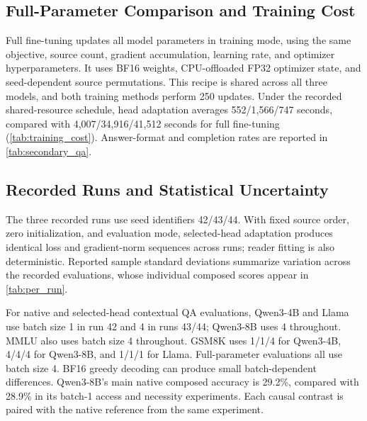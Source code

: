 \subsection{Full-Parameter Comparison and Training Cost}
\label{app:fullft_protocol}

Full fine-tuning updates all model parameters in training mode, using the same objective, source count, gradient accumulation, learning rate, and optimizer hyperparameters. It uses BF16 weights, CPU-offloaded FP32 optimizer state, and seed-dependent source permutations. This recipe is shared across all three models, and both training methods perform 250 updates. Under the recorded shared-resource schedule, head adaptation averages 552/1,566/747 seconds, compared with 4,007/34,916/41,512 seconds for full fine-tuning (\cref{tab:training_cost}). Answer-format and completion rates are reported in \cref{tab:secondary_qa}.

\begin{table}[!htbp]
  \centering
  \caption{Training workload and measured duration across three recorded runs. Both methods use one pass over 2,000 composed sources.}
  \label{tab:training_cost}
  \small
  \setlength{\tabcolsep}{5pt}
  
\end{table}

\subsection{Recorded Runs and Statistical Uncertainty}
\label{app:uncertainty}

The three recorded runs use seed identifiers 42/43/44. With fixed source order, zero initialization, and evaluation mode, selected-head adaptation produces identical loss and gradient-norm sequences across runs; reader fitting is also deterministic. Reported sample standard deviations summarize variation across the recorded evaluations, whose individual composed scores appear in \cref{tab:per_run}.

For native and selected-head contextual QA evaluations, Qwen3-4B and Llama use batch size 1 in run 42 and 4 in runs 43/44; Qwen3-8B uses 4 throughout. MMLU also uses batch size 4 throughout. GSM8K uses 1/1/4 for Qwen3-4B, 4/4/4 for Qwen3-8B, and 1/1/1 for Llama. Full-parameter evaluations all use batch size 4. BF16 greedy decoding can produce small batch-dependent differences. Qwen3-8B's main native composed accuracy is 29.2\%, compared with 28.9\% in its batch-1 access and necessity experiments. Each causal contrast is paired with the native reference from the same experiment.

